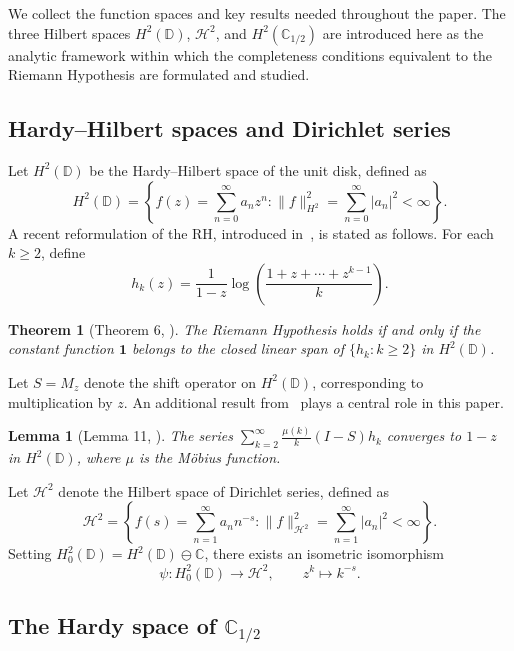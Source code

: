 \documentclass[11pt]{extarticle}
\numberwithin{equation}{section}
\theoremstyle{plain}
\newtheorem{theorem}{Theorem}[section]
\newtheorem{lemma}{Lemma}[section]
\theoremstyle{definition}
\begin{document}
We collect the function spaces and key results needed throughout the paper. The three Hilbert spaces $H^2(\mathbb{D})$, $\mathcal{H}^2$, and $H^2(\mathbb{C}_{1/2})$ are introduced here as the analytic framework within which the completeness conditions equivalent to the Riemann Hypothesis are formulated and studied.

\subsection{Hardy--Hilbert spaces and Dirichlet series}

Let $H^2(\mathbb{D})$ be the Hardy--Hilbert space of the unit disk, defined as
\[
H^2(\mathbb{D}) = \left\{ f(z) = \sum_{n=0}^{\infty} a_n z^n : \|f\|_{H^2}^2 = \sum_{n=0}^{\infty} |a_n|^2 < \infty \right\}.
\]
A recent reformulation of the RH, introduced in~\cite{waleed1}, is stated as follows. For each $k \geq 2$, define
\[
h_k(z) = \frac{1}{1-z} \log\!\left(\frac{1 + z + \cdots + z^{k-1}}{k}\right).
\]

\begin{theorem}[Theorem 6, \cite{waleed1}]
The Riemann Hypothesis holds if and only if the constant function $\mathbf{1}$ belongs to the closed linear span of $\{h_k : k \geq 2\}$ in $H^2(\mathbb{D})$.
\end{theorem}

Let $S = M_z$ denote the shift operator on $H^2(\mathbb{D})$, corresponding to multiplication by $z$. An additional result from~\cite{waleed1} plays a central role in this paper.

\begin{lemma}[Lemma 11, \cite{waleed1}]
\label{lem1:waleed}
The series $\sum_{k=2}^{\infty} \frac{\mu(k)}{k}(I - S)h_k$ converges to $1 - z$ in $H^2(\mathbb{D})$, where $\mu$ is the M\"{o}bius function.
\end{lemma}

Let $\mathcal{H}^2$ denote the Hilbert space of Dirichlet series, defined as
\[
\mathcal{H}^2 = \left\{ f(s) = \sum_{n=1}^{\infty} a_n n^{-s} : \|f\|_{\mathcal{H}^2}^2 = \sum_{n=1}^{\infty} |a_n|^2 < \infty \right\}.
\]
Setting $H^2_0(\mathbb{D}) = H^2(\mathbb{D}) \ominus \mathbb{C}$, there exists an isometric isomorphism
\[
\psi : H^2_0(\mathbb{D}) \longrightarrow \mathcal{H}^2, \qquad z^k \longmapsto k^{-s}.
\]


\subsection{The Hardy space of $\mathbb{C}_{1/2}$}
\end{document}
